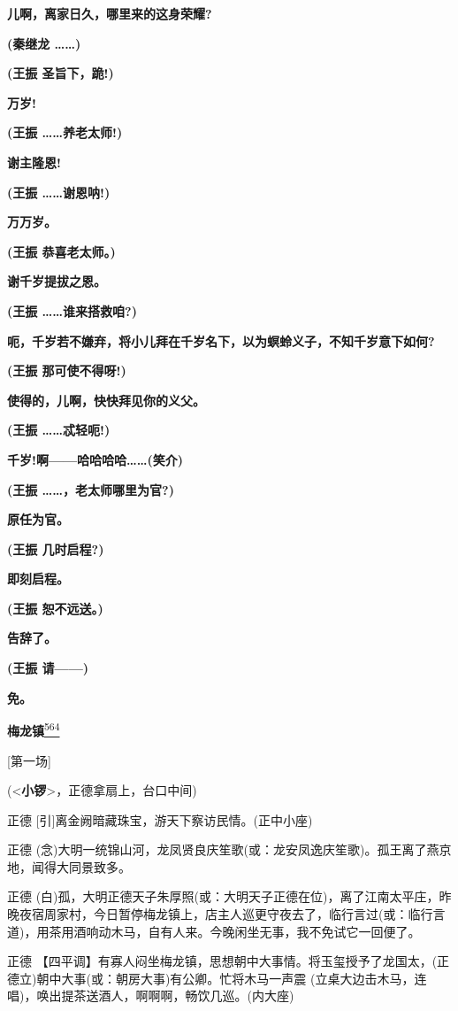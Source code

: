 \textbf{儿啊，离家日久，哪里来的这身荣耀?}

\textbf{(秦继龙 \ldots{}\ldots{})}

\textbf{(王振 圣旨下，跪!)}

\textbf{万岁!}

\textbf{(王振 \ldots{}\ldots{}养老太师!)}

\textbf{谢主隆恩!}

\textbf{(王振 \ldots{}\ldots{}谢恩呐!)}

\textbf{万万岁。}

\textbf{(王振 恭喜老太师。)}

\textbf{谢千岁提拔之恩。}

\textbf{(王振 \ldots{}\ldots{}谁来搭救咱?)}

\textbf{呃，千岁若不嫌弃，将小儿拜在千岁名下，以为螟蛉义子，不知千岁意下如何?}

\textbf{(王振 那可使不得呀!)}

\textbf{使得的，儿啊，快快拜见你的义父。}

\textbf{(王振 \ldots{}\ldots{}忒轻呃!)}

\textbf{千岁!啊------哈哈哈哈\ldots{}\ldots{}(笑介)}

\textbf{(王振 \ldots{}\ldots{}，老太师哪里为官?)}

\textbf{原任为官。}

\textbf{(王振 几时启程?)}

\textbf{即刻启程。}

\textbf{(王振 恕不远送。)}

\textbf{告辞了。}

\textbf{(王振 请------)}

\textbf{免。}

\textbf{梅龙镇}\protect\hyperlink{fn564}{\textsuperscript{564}}

{[}第一场{]}

(\textless{}\textbf{小锣}\textgreater{}，正德拿扇上，台口中间)

正德 {[}引{]}离金阙暗藏珠宝，游天下察访民情。(正中小座)

正德
(念)大明一统锦山河，龙凤贤良庆笙歌(或：龙安凤逸庆笙歌)。孤王离了燕京地，闻得大同景致多。

正德
(白)孤，大明正德天子朱厚照(或：大明天子正德在位)，离了江南太平庄，昨晚夜宿周家村，今日暂停梅龙镇上，店主人巡更守夜去了，临行言过(或：临行言道)，用茶用酒响动木马，自有人来。今晚闲坐无事，我不免试它一回便了。

正德
【四平调】有寡人闷坐梅龙镇，思想朝中大事情。将玉玺授予了龙国太，(正德立)朝中大事(或：朝房大事)有公卿。忙将木马一声震
(立桌大边击木马，连唱)，唤出提茶送酒人，啊啊啊，畅饮几巡。(内大座)

